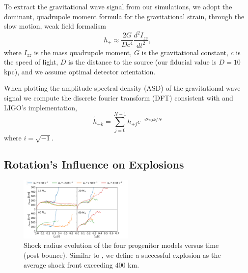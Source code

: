 \documentclass[twocolumn,times]{aastex62}  %
\begin{document}
To extract the gravitational wave signal from our simulations, we adopt the dominant, quadrupole moment formula for the gravitational strain, through the slow motion, weak field formalism %
\citep[eg.][]{finn:1990,blanchet:1990}
\begin{equation}
    h_+ \approx \frac{2G}{Dc^4}
    \frac{d^2I_{zz}}{dt^2},
\label{eq:quad}
\end{equation}
where $I_{zz}$ is the mass quadrupole moment, $G$ is the gravitational constant, $c$ is the speed of light, $D$ is the distance to the source (our fiducial value is $D=10$ kpc), and we assume optimal detector orientation.\\
\par When plotting the amplitude spectral density (ASD) of the gravitational wave signal we compute the discrete fourier transform (DFT) consistent with \citet{anderson:2004} and LIGO's implementation,
\begin{equation}
\widetilde{h}_{+k} = \sum^{N-1}_{j=0} h_{+j} e^{-i2\pi jk/N}
\label{eq:dft}
\end{equation}
where $i=\sqrt{-1}$.

\subsection{Rotation's Influence on Explosions}

\begin{figure}[t]
    \centering
    \includegraphics[width = 0.5\textwidth]{figures/M1_shock_mass_top_legend.pdf}
    \caption{Shock radius evolution of the four  progenitor models versus time (post bounce).  Similar to \citet{couch:2013b}, we define a successful explosion as the average shock front exceeding 400 km. }
    \label{fig:shock}
\end{figure}
\end{document}
